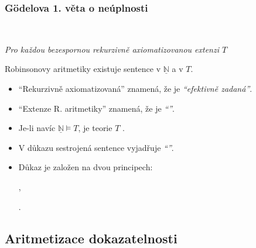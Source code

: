 \subsubsection*{Gödelova 1. věta o neúplnosti}
    \ \ {\it Pro každou bezespornou rekurzivně axiomatizovanou extenzi $T$

    
    Robinsonovy aritmetiky existuje sentence  v $\underline{\mathbb{N}}$ a  v $T$.}
    \medskip
    
    \smallskip
    
    {\it {}
    
    \begin{itemize}
    \item ``Rekurzivně axiomatizovaná'' znamená, že je \emph{``efektivně zadaná''}.
    \smallskip
    
    \item ``Extenze R. aritmetiky'' znamená, že je \emph{``''}.
    \smallskip
    
    \item Je-li navíc $\underline{\mathbb{N}}\models T$, je teorie $T$ .
    \smallskip
    
    \item V důkazu sestrojená sentence vyjadřuje \emph{``''}.
    \smallskip
    
    \item Důkaz je založen na dvou principech:
    \medskip
    
    ,
    \medskip
    
    .
    \end{itemize}}
    
    

    \subsection{Aritmetizace dokazatelnosti}
